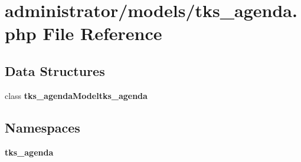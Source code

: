 \section{administrator/models/tks\+\_\+agenda.php File Reference}
\label{administrator_2models_2tks__agenda_8php}
\subsection*{Data Structures}
\begin{DoxyCompactItemize}
\item 
class \textbf{ tks\+\_\+agenda\+Modeltks\+\_\+agenda}
\end{DoxyCompactItemize}
\subsection*{Namespaces}
\begin{DoxyCompactItemize}
\item 
 \textbf{ tks\+\_\+agenda}
\end{DoxyCompactItemize}
